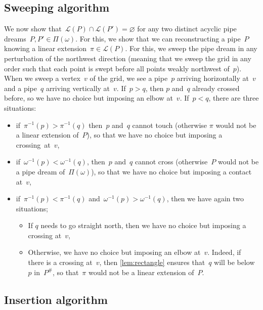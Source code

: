 \documentclass{amsart}
\theoremstyle{definition}
\newcommand{\vincent}[1]{\todo[color=blue!30]{#1 \\ \hfill --- V.}}
\newcommand{\pipeDreams}{\Pi} %
\newcommand{\contact}{^\#} %
\newcommand{\linearExtensions}{\mathcal{L}} %
\begin{document}

\subsection{Sweeping algorithm}
\label{subsec:sweepingAlgorithm}

\vincent{adapt the following}
We now show that~$\linearExtensions(P) \cap \linearExtensions(P') = \varnothing$ for any two distinct acyclic pipe dreams~$P, P' \in \pipeDreams(\omega)$.
For this, we show that we can reconstructing a pipe~$P$ knowing a linear extension~$\pi \in \linearExtensions(P)$.
For this, we sweep the pipe dream in any perturbation of the northwest direction (meaning that we sweep the grid in any order such that each point is swept before all points weakly northwest of~$p$).
When we sweep a vertex~$v$ of the grid, we see a pipe~$p$ arriving horizontally at~$v$ and a pipe~$q$ arriving vertically at~$v$.
If~$p > q$, then $p$ and~$q$ already crossed before, so we have no choice but imposing an elbow at~$v$.
If~$p < q$, there are three situations:
\begin{itemize}
\item if~$\pi^{-1}(p) > \pi^{-1}(q)$ then~$p$ and~$q$ cannot touch (otherwise $\pi$ would not be a linear extension of~$P$), so that we have no choice but imposing a crossing~at~$v$,
\item if~$\omega^{-1}(p) < \omega^{-1}(q)$, then~$p$ and~$q$ cannot cross (otherwise~$P$ would not be a pipe dream of~$\pipeDreams(\omega)$), so that we have no choice but imposing a contact at~$v$,
\item if~$\pi^{-1}(p) < \pi^{-1}(q)$ and~$\omega^{-1}(p) > \omega^{-1}(q)$, then we have again two situations;
	\begin{itemize}
	\item If $q$ needs to go straight north, then we have no choice but imposing a crossing at~$v$,
	\item Otherwise, we have no choice but imposing an elbow at~$v$. Indeed, if there is a crossing at~$v$, then \cref{lem:rectangle} ensures that~$q$ will be below~$p$ in~$P\contact$, so that~$\pi$ would not be a linear extension of~$P$.
	\end{itemize}
\end{itemize}


\subsection{Insertion algorithm}
\label{subsec:insertionAlgorithm}
\end{document}
